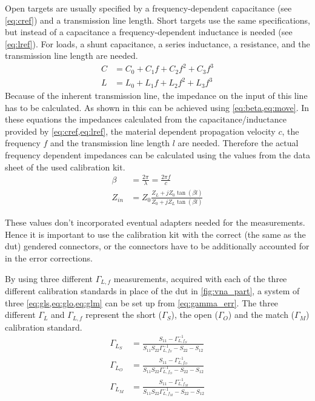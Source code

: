 \documentclass[12pt,a4paper,parskip=full,abstract=true,BCOR=10mm,twoside,open=right]{scrreprt}
\begin{document}
Open targets are usually specified by a frequency-dependent capacitance (see
\cref{eq:cref}) and a transmission line length. Short targets use the same
specifications, but instead of a capacitance a frequency-dependent inductance is
needed (see \cref{eq:lref}). For loads, a shunt capacitance, a series inductance,
a resistance, and the transmission line length are needed.
\begin{align}
    \label{eq:cref} C & = C_0 + C_1 f + C_2 f^2 + C_3 f^3 \\
    \label{eq:lref} L & = L_0 + L_1 f + L_2 f^2 + L_3 f^3
\end{align}
Because of the inherent transmission line, the impedance on the input of this
line has to be calculated. As shown in \cite{pozar_mw_engineering_2011} this
can be achieved using \cref{eq:beta,eq:move}. In these equations the impedances
calculated from the capacitance/inductance provided by \cref{eq:cref,eq:lref},
the material dependent propagation velocity $c$, the frequency $f$ and the transmission line
length $l$ are needed. Therefore the actual frequency dependent impedances can
be calculated using the values from the data sheet of the used calibration kit.
\begin{align}
    \label{eq:beta} \beta & = \frac{2 \pi}{\lambda} = \frac{2 \pi f}{c}\\
    \label{eq:move} Z_{in} & = Z_0 \frac{Z_L + j Z_0 \tan(\beta l)}{Z_0 + j Z_L \tan(\beta l)}
\end{align}

These values don't incorporated eventual adapters needed for the measurements.
Hence it is important to use the calibration kit with the correct (the same as the \gls{dut}) gendered connectors, or
the connectors have to be additionally accounted for in the error corrections.

By using three different $\Gamma_{L,f}$ measurements, acquired with each of the three different calibration standards in place of the \gls{dut} in \cref{fig:vna_part},
a system of three \cref{eq:gls,eq:glo,eq:glm} can be set up from \cref{eq:gamma_err}. The
three different $\Gamma_L$ and $\Gamma_{L,f}$ represent the short ($\Gamma_S$),
the open ($\Gamma_O$) and the match ($\Gamma_M$) calibration standard.
\begin{align}
    \label{eq:gls} \Gamma_{L_S} & = \frac{S_{11} - \Gamma_{L,f_S}^{-1}}{S_{11} S_{22}\Gamma_{L,f_S}^{-1} - S_{22} - S_{12}} \\
    \label{eq:glo} \Gamma_{L_O} & = \frac{S_{11} - \Gamma_{L,f_O}^{-1}}{S_{11} S_{22}\Gamma_{L,f_O}^{-1} - S_{22} - S_{12}} \\
    \label{eq:glm} \Gamma_{L_M} & = \frac{S_{11} - \Gamma_{L,f_M}^{-1}}{S_{11} S_{22}\Gamma_{L,f_M}^{-1} - S_{22} - S_{12}}
\end{align}
\end{document}
